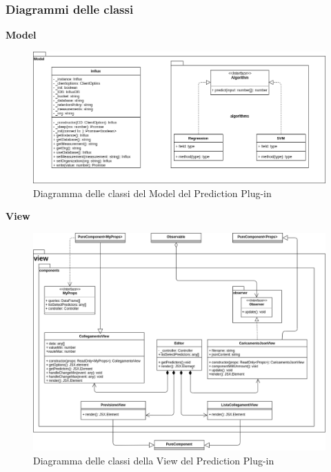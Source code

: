 \subsubsection{Diagrammi delle classi}
\textbf{Model}
\begin{figure}[H]
\centering
\includegraphics[scale=0.5]{../../Diagrams/Classes_diagrams/plugin_model.png}
\caption{Diagramma delle classi del Model del Prediction Plug-in}
\end{figure}

\textbf{View}
\begin{figure}[H]
\centering
\includegraphics[scale=0.4]{../../Diagrams/Classes_diagrams/plugin_view.png}
\caption{Diagramma delle classi della View del Prediction Plug-in}
\end{figure}

